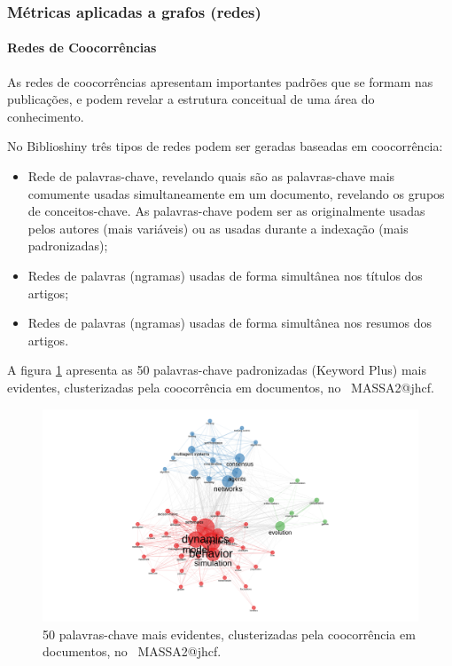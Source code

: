 \subsubsection{Métricas aplicadas a grafos (redes)}

\paragraph{Redes de Coocorrências}

As redes de coocorrências apresentam importantes padrões que se formam nas publicações, e podem revelar a estrutura conceitual de uma área do conhecimento.

No Biblioshiny três tipos de redes podem ser geradas baseadas em coocorrência:
\begin{itemize}
    \item Rede de palavras-chave, revelando quais são as palavras-chave mais comumente usadas simultaneamente em um documento, revelando os grupos de conceitos-chave. As palavras-chave podem ser as originalmente usadas pelos autores (mais variáveis) ou as usadas durante a indexação (mais padronizadas);
    \item Redes de palavras (ngramas) usadas de forma simultânea nos títulos dos artigos;
    \item Redes de palavras (ngramas) usadas de forma simultânea nos resumos dos artigos.
\end{itemize}

A figura \ref{fig:MASSA2-Co-occurrence-Network-50nodes-louvainclustering.png} apresenta as 50 palavras-chave padronizadas (Keyword Plus) mais evidentes, clusterizadas pela coocorrência em documentos, no  \dataset\ MASSA2@jhcf.

\begin{figure}
    \centering
    \includegraphics[width=1\textwidth]{exploratory-data-analysis/jhcf/PesqBibliogr/SimulacaoMultiagente/WoS-20220203/Estrutura/Conceitual/MASSA2-Co-occurrence-Network-50nodes-louvainclustering.png.png}
    \caption{50 palavras-chave mais evidentes, clusterizadas pela coocorrência em documentos, no  \dataset\ MASSA2@jhcf.}
    \label{fig:MASSA2-Co-occurrence-Network-50nodes-louvainclustering.png}
\end{figure}

